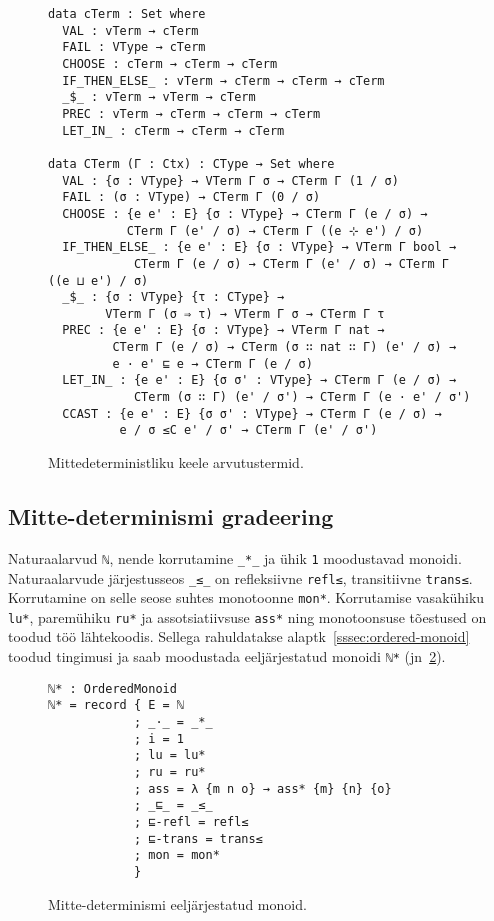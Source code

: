 \documentclass[a4paper,12pt]{article}
\begin{document}
\begin{figure}
  \begin{BVerbatim}
data cTerm : Set where
  VAL : vTerm → cTerm
  FAIL : VType → cTerm
  CHOOSE : cTerm → cTerm → cTerm
  IF_THEN_ELSE_ : vTerm → cTerm → cTerm → cTerm
  _$_ : vTerm → vTerm → cTerm
  PREC : vTerm → cTerm → cTerm → cTerm
  LET_IN_ : cTerm → cTerm → cTerm

data CTerm (Γ : Ctx) : CType → Set where
  VAL : {σ : VType} → VTerm Γ σ → CTerm Γ (1 / σ)
  FAIL : (σ : VType) → CTerm Γ (0 / σ)
  CHOOSE : {e e' : E} {σ : VType} → CTerm Γ (e / σ) →
           CTerm Γ (e' / σ) → CTerm Γ ((e ⊹ e') / σ)
  IF_THEN_ELSE_ : {e e' : E} {σ : VType} → VTerm Γ bool →
            CTerm Γ (e / σ) → CTerm Γ (e' / σ) → CTerm Γ ((e ⊔ e') / σ)
  _$_ : {σ : VType} {τ : CType} →
        VTerm Γ (σ ⇒ τ) → VTerm Γ σ → CTerm Γ τ
  PREC : {e e' : E} {σ : VType} → VTerm Γ nat →
         CTerm Γ (e / σ) → CTerm (σ ∷ nat ∷ Γ) (e' / σ) →
         e · e' ⊑ e → CTerm Γ (e / σ)
  LET_IN_ : {e e' : E} {σ σ' : VType} → CTerm Γ (e / σ) →
            CTerm (σ ∷ Γ) (e' / σ') → CTerm Γ (e · e' / σ')
  CCAST : {e e' : E} {σ σ' : VType} → CTerm Γ (e / σ) →
          e / σ ≤C e' / σ' → CTerm Γ (e' / σ')

  \end{BVerbatim}
  \caption{Mittedeterministliku keele arvutustermid.}
  \label{fig:nd.cterms}
\end{figure}


\subsection{Mitte-determinismi gradeering}\label{ssec:nd.grading}

Naturaalarvud {\tt ℕ}, nende korrutamine {\tt _*_} ja ühik {\tt 1} moodustavad monoidi.
Naturaalarvude järjestusseos {\tt _≤_} on refleksiivne {\tt refl≤}, transitiivne {\tt trans≤}. Korrutamine on selle seose suhtes monotoonne {\tt mon*}.
Korrutamise vasakühiku {\tt lu*}, paremühiku {\tt ru*} ja assotsiatiivsuse {\tt ass*} ning monotoonsuse tõestused on toodud töö lähtekoodis.
Sellega rahuldatakse alaptk~\ref{sssec:ordered-monoid} toodud tingimusi ja saab moodustada eeljärjestatud monoidi {\tt ℕ*} (jn~\ref{fig:nd.ordered-monoid}).
\begin{figure}
  \begin{BVerbatim}
ℕ* : OrderedMonoid
ℕ* = record { E = ℕ
            ; _·_ = _*_
            ; i = 1
            ; lu = lu*
            ; ru = ru*
            ; ass = λ {m n o} → ass* {m} {n} {o}
            ; _⊑_ = _≤_
            ; ⊑-refl = refl≤
            ; ⊑-trans = trans≤
            ; mon = mon*
            }
  \end{BVerbatim}
  \caption{Mitte-determinismi eeljärjestatud monoid.}
  \label{fig:nd.ordered-monoid}
\end{figure}
\end{document}
